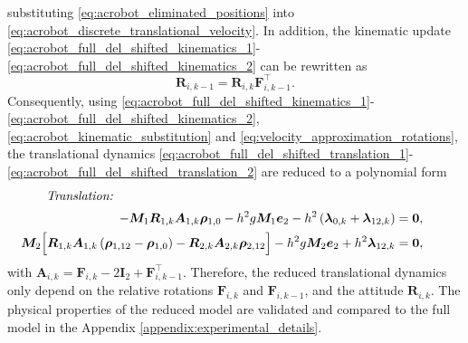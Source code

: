 substituting \eqref{eq:acrobot_eliminated_positions} into \eqref{eq:acrobot_discrete_translational_velocity}.
In addition, the kinematic update \eqref{eq:acrobot_full_del_shifted_kinematics_1}-\eqref{eq:acrobot_full_del_shifted_kinematics_2} can be rewritten as
\begin{equation}
\bm{R}_{i,k-1}=\bm{R}_{i,k}\bm{F}_{i,k-1}^{\top}.
\label{eq:acrobot_kinematic_substitution}
\end{equation}
Consequently, using \eqref{eq:acrobot_full_del_shifted_kinematics_1}-\eqref{eq:acrobot_full_del_shifted_kinematics_2},
\eqref{eq:acrobot_kinematic_substitution} and \eqref{eq:velocity_approximation_rotations},
the translational dynamics 
\eqref{eq:acrobot_full_del_shifted_translation_1}-\eqref{eq:acrobot_full_del_shifted_translation_2} are reduced to a polynomial form 
\begin{subequations}
\begingroup
\setlength{\jot}{0.35em}
\vspace{-0.3cm}
\begin{align}
    \intertext{\textit{Translation:}}
    \vspace{-0.1cm}
    -\bm{M}_1 \bm{R}_{1,k}
    \bm{A}_{1,k}\bm{\rho}_{1,0}
    -h^2g\bm{M}_1\bm{e}_2
    -h^2\left(\bm{\lambda}_{0,k}+\bm{\lambda}_{12,k}\right)
    &=
    \bm{0},
    \label{eq:acrobot_full_del_shifted_translation_1_reduced}
    \\
\hspace{-2em}
    \bm{M}_2\Bigl[
    \bm{R}_{1,k}
    \bm{A}_{1,k}
    \left(\bm{\rho}_{1,12}-\bm{\rho}_{1,0}\right)
    -\bm{R}_{2,k}
    \bm{A}_{2,k}\bm{\rho}_{2,12}
    \Bigr]
    -h^2g\bm{M}_2\bm{e}_2
    +h^2\bm{\lambda}_{12,k}
    &=
    \bm{0},
    \label{eq:acrobot_full_del_shifted_translation_2_reduced}
\end{align}
\endgroup
\end{subequations}
with $\bm{A}_{i,k}=\bm{F}_{i,k}-2\bm{I}_2+\bm{F}_{i,k-1}^{\top}$.
Therefore, the reduced translational dynamics only depend on the relative rotations
$\bm{F}_{i,k}$ and $\bm{F}_{i,k-1}$, and the attitude $\bm{R}_{i,k}$.
The physical properties of the reduced model are validated and compared to the full model in the 
Appendix \ref{appendix:experimental_details}.

